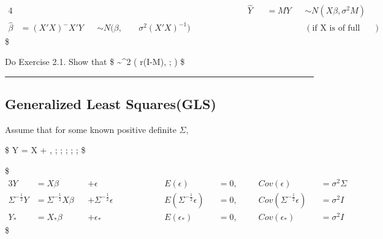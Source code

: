 \documentclass[
]{book}
\begin{document}
{{{\begin{alignat}{4}
& && && && && && && \; \hat Y && = MY &&\sim N(X\beta, \sigma^2 M)


\\

\hat \beta &= (X'X)^- X'Y &&\sim N(\beta , \; &&\sigma^2 (X'X)^{-1}) && && && && && && (\text{if X is of full rank})



\end{alignat}
\$

Do Exercise 2.1. Show that
\$
 \sim \chi\^{}2 \Bigg( r(I-M), ;  \Bigg)
\$

\begin{center}\rule{0.5\linewidth}{0.5pt}\end{center}

\hypertarget{generalized-least-squaresgls}{%
\subsection{Generalized Least Squares(GLS)}\label{generalized-least-squaresgls}}

Assume that for some known positive definite \(\Sigma\),

\$
Y = X \beta + \epsilon, ; ; ; ; ;
\$

\$
\begin{alignat}{3}

Y &= X \beta &&+ \epsilon && \; \; \; \; \; \; \; \; \; \; 

&& E(\epsilon)&&=0, \; \; &&\; Cov(\epsilon) &&= \sigma^2 \Sigma \tag{1}\\








\Sigma^{-\tfrac{1}{2}}Y &= \Sigma^{-\tfrac{1}{2}} X \beta &&+ \Sigma^{-\tfrac{1}{2}} \epsilon 


 && \; \; \; \; \; \; \; \; \; \; && E(\Sigma^{-\tfrac{1}{2}} \epsilon)&&=0, &&\; Cov(\Sigma^{-\tfrac{1}{2}} \epsilon) &&= \sigma^2 I \tag{2, by SVD}
\\

Y_\ast &= X_\ast \beta &&+ \epsilon_\ast



 && \; \; \; \; \; \; \; \; \; \; && E( \epsilon_\ast)&&=0, &&\; Cov( \epsilon_\ast) &&= \sigma^2 I



\end{alignat}
\$

}}}
\end{document}
